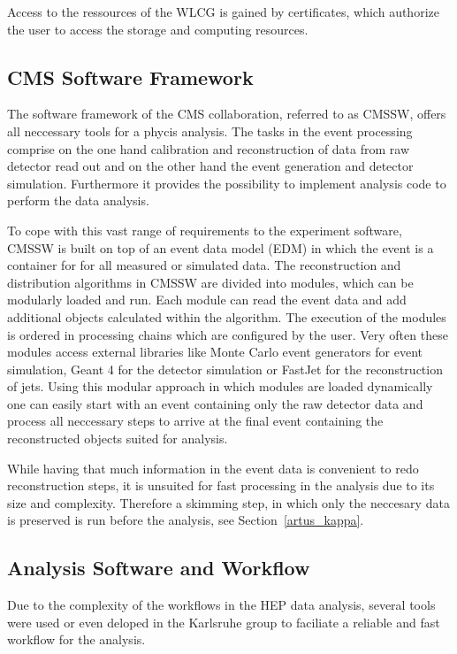Access to the ressources of the WLCG is gained by certificates, which authorize
the user to access the storage and computing resources.


\subsection{CMS Software Framework}

The software framework of the CMS collaboration, referred to as CMSSW, offers
all neccessary tools for a phycis analysis. The tasks in the event processing
comprise on the one hand calibration and reconstruction of data from raw
detector read out and on the other hand the event generation and detector
simulation. Furthermore it provides the possibility to implement analysis code
to perform the data analysis. 

To cope with this vast range of requirements to the experiment software, CMSSW
is built on top of an event data model (EDM) in which the event is a
container for for all measured or simulated data. The reconstruction and
distribution algorithms in CMSSW are divided into modules, which can be
modularly loaded and run. Each module can read the event data and add additional
objects calculated within the algorithm. The execution of the modules is ordered
in processing chains which are configured by the user. Very often these modules
access external libraries like Monte Carlo event generators for event
simulation, Geant 4 for the detector simulation or FastJet for the
reconstruction of jets. Using this modular approach in which modules are loaded
dynamically one can easily start with an event containing only the raw detector
data and process all neccessary steps to arrive at the final event containing
the reconstructed objects suited for analysis.

While having that much information in the event data is convenient to redo
reconstruction steps, it is unsuited for fast processing in the analysis due to
its size and complexity. Therefore a skimming step, in which only the neccesary
data is preserved is run before the analysis, see Section~\ref{artus_kappa}.

\subsection{Analysis Software and Workflow}

Due to the complexity of the workflows in the HEP data analysis, several tools
were used or even deloped in the Karlsruhe group to faciliate a reliable and
fast workflow for the analysis. 


